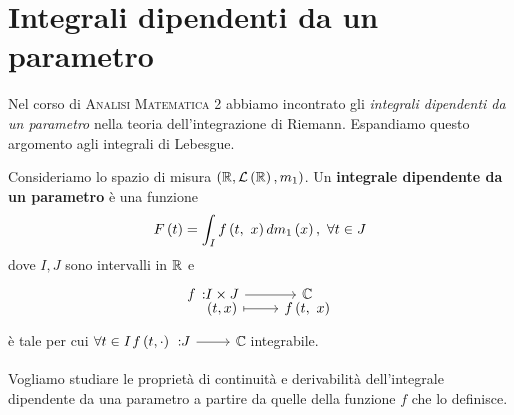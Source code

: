 \section{Integrali dipendenti da un parametro}
Nel corso di \textsc{Analisi Matematica 2} abbiamo incontrato gli \textit{integrali dipendenti da un parametro} nella teoria dell'integrazione di Riemann. Espandiamo questo argomento agli integrali di Lebesgue.
\begin{define}
	Consideriamo lo spazio di misura $\left(\mathbb{R},\mathcal{L}\left(\mathbb{R}\right),m_1\right)$. Un \textbf{integrale dipendente da un parametro} è una funzione
	\begin{equation}
		F\left(t\right)=\int_I\mvf{f}{t}{x}dm_1\left(x\right),\ \forall t\in J
	\end{equation}
dove $I,J$ sono intervalli in $\mathbb{R}$ e
\begin{equation*}
	\funztot{f}{I\times J}{\complexset}{\left(t,x\right)}{\mvf{f}{t}{x}}
\end{equation*}
è tale per cui $\forall t\in I\ \funz{f\left(t,\cdot\right)}{J}{\complexset}$ integrabile.
\end{define}
Vogliamo studiare le proprietà di continuità e derivabilità dell'integrale dipendente da una parametro a partire da quelle della funzione $f$ che lo definisce.
